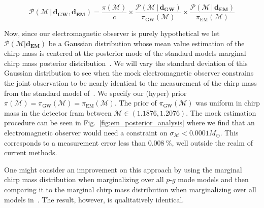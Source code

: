 \begin{equation}
    \mathcal{P}(\mathcal{M} \, |  \, \mathbf{d_{GW}}, \mathbf{d_{EM}}) = \frac{\pi(\mathcal{M})}{c} \times \frac{\mathcal{P}(\mathcal{M} \, | \, \mathbf{d_{GW}})}{\pi_{\mathrm{GW}}(\mathcal{M})} \times \frac{\mathcal{P}(\mathcal{M} \, | \, \mathbf{d_{EM}})}{\pi_{\mathrm{EM}}(\mathcal{M})}
\end{equation}

Now, since our electromagnetic observer is purely hypothetical we let $\mathcal{P}(\mathcal{M} | \mathbf{d_{EM}})$ be a Gaussian distribution whose mean value estimation of the chirp mass is centered at the posterior mode of the standard models marginal chirp mass posterior distribution~\cite{de2018tidal}. We will vary the standard deviation of this Gaussian distribution to see when the mock electromagnetic observer constrains the joint observation to be nearly identical to the measurement of the chirp mass from the standard model of~\cite{2018tidal}. We specify our (hyper) prior $\pi(\mathcal{M}) = \pi_{\mathrm{GW}}(\mathcal{M}) = \pi_{\mathrm{EM}}(\mathcal{M})$. The prior of $\pi_{\mathrm{GW}}(\mathcal{M})$ was uniform in chirp mass in the detector fram between $\mathcal{M} \in (1.1876, 1.2076)$. The mock estimation procedure can be seen in Fig.~\ref{fig:em_posterior_analysis} where we find that an electromagnetic observer would need a constraint on $\sigma_{\mathcal{M}} < 0.0001 M_{\odot}$. This corresponds to a measurement error less than $0.008~\%$, well outside the realm of current methods.

One might consider an improvement on this approach by using the marginal chirp mass distribution when marginalizing over all $p$-$g$ mode models and then comparing it to the marginal chirp mass distribution when marginalizing over all models in~\cite{de2018tidal}. The result, however, is qualitatively identical.

